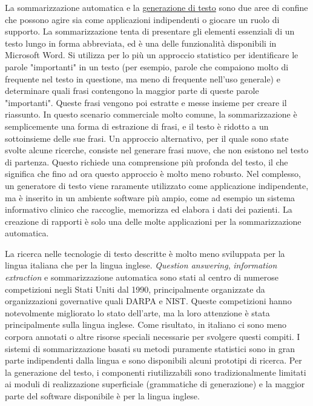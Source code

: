 \documentclass[]{../../metanetpaper}
\begin{document}
\begin{multicols}{2}
La sommarizzazione automatica e la \underline{generazione di testo} sono due aree di confine che possono agire sia come applicazioni indipendenti o giocare un ruolo di supporto. La sommarizzazione tenta di presentare gli elementi essenziali di un testo lungo in forma abbreviata, ed \`{e} una delle funzionalit\`{a} disponibili in Microsoft Word. Si utilizza per lo pi\`{u} un approccio statistico per identificare le parole "importanti" in un testo (per esempio, parole che compaiono molto di frequente nel testo in questione, ma meno di frequente nell'uso generale) e determinare quali frasi contengono la maggior parte di queste parole "importanti". Queste frasi vengono poi estratte e messe insieme per creare il riassunto. In questo scenario commerciale molto comune, la sommarizzazione \`{e} semplicemente una forma di estrazione di frasi, e il testo \`{e} ridotto a un sottoinsieme delle sue frasi. Un approccio alternativo, per il quale sono state svolte alcune ricerche, consiste nel generare frasi nuove, che non esistono nel testo di partenza. Questo richiede una comprensione pi\`{u} profonda del testo, il che significa che fino ad ora questo approccio \`{e} molto meno robusto. Nel complesso, un generatore di testo viene raramente utilizzato come applicazione indipendente, ma \`{e} inserito in un ambiente software pi\`{u} ampio, come ad esempio un sistema informativo clinico che raccoglie, memorizza ed elabora i dati dei pazienti. La creazione di rapporti \`{e} solo una delle molte applicazioni per la sommarizzazione automatica.




La ricerca nelle tecnologie di testo descritte \`{e} molto meno sviluppata per la lingua italiana che per la lingua inglese. \emph{Question answering}, \emph{information extraction} e sommarizzazione automatica sono stati al centro di numerose competizioni negli Stati Uniti dal 1990, principalmente organizzate da organizzazioni governative quali DARPA e NIST. Queste competizioni hanno notevolmente migliorato lo stato dell'arte, ma la loro attenzione \`{e} stata principalmente sulla lingua inglese. Come risultato, in italiano ci sono meno corpora annotati o altre risorse speciali necessarie per svolgere questi compiti. I sistemi di sommarizzazione basati su  metodi puramente statistici sono in gran parte indipendenti dalla lingua e sono disponibili alcuni prototipi di ricerca. Per la generazione del testo, i componenti riutilizzabili sono tradizionalmente limitati ai moduli di realizzazione superficiale (grammatiche di generazione) e la maggior parte del software disponibile \`{e} per la lingua inglese.




\end{multicols}
\end{document}
